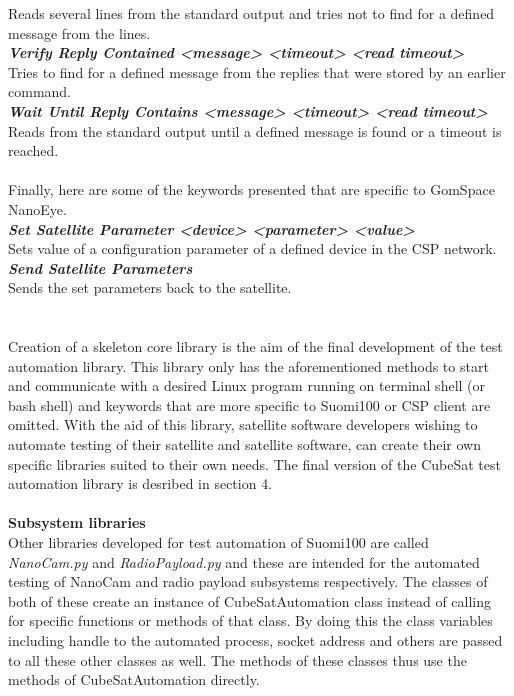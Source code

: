 \documentclass[english,12pt,a4paper,pdftex,elec,utf8]{aaltothesis}
\begin{document}
Reads several lines from the standard output and tries not to find for a defined message from the lines.\\
\textit{\textbf{Verify Reply Contained  <message> <timeout> <read timeout>}}\\
Tries to find for a defined message from the replies that were stored by an earlier command.\\
\textit{\textbf{Wait Until Reply Contains  <message> <timeout> <read timeout>}}\\
Reads from the standard output until a defined message is found or a timeout is reached.\\
\\
Finally, here are some of the keywords presented that are specific to GomSpace NanoEye.\\
\textit{\textbf{Set Satellite Parameter  <device> <parameter> <value>}}\\
Sets value of a configuration parameter of a defined device in the CSP network. \\
\textit{\textbf{Send Satellite Parameters}}\\
Sends the set parameters back to the satellite.\\
\\
\\
Creation of a skeleton core library is the aim of the final development of the test automation library. This library only has the aforementioned methods to start and communicate with a desired Linux program running on terminal shell (or bash shell) and keywords that are more specific to Suomi100 or CSP client are omitted. With the aid of this library, satellite software developers wishing to automate testing of their satellite and satellite software, can       create their own specific libraries suited to their own needs. The final version of the CubeSat test automation library is desribed in section 4.\\
\\
\textbf{Subsystem libraries}\\ 
Other libraries developed for test automation of Suomi100 are called \textit{NanoCam.py} and \textit{RadioPayload.py} and these are intended for the automated testing of NanoCam and radio payload subsystems respectively. The classes of both of these create an instance of CubeSatAutomation class instead of calling for specific functions or methods of that class. By doing this the class variables including handle to the automated process, socket address and others are passed to all these other classes as well. The methods of these classes thus use the methods of CubeSatAutomation directly.\par
\end{document}
